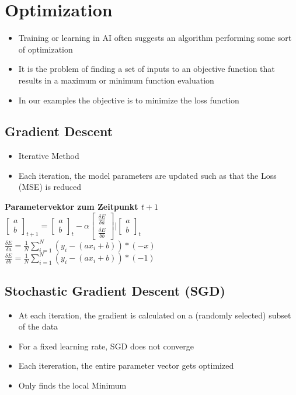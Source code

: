 \section{Optimization}
\begin{itemize}
    \item Training or learning in AI often suggests an algorithm performing some sort of optimization
    \item It is the problem of finding a set of inputs to an objective function that results in a maximum or minimum function evaluation
    \item In our examples the objective is to minimize the loss function
\end{itemize}

\subsection{Gradient Descent}
\begin{itemize}
    \item Iterative Method
    \item Each iteration, the model parameters are updated such as that the Loss (MSE) is reduced
\end{itemize}
\begin{center}
    \textbf{Parametervektor zum Zeitpunkt $t+1$}\\
    $\begin{bmatrix}
        a \\b
    \end{bmatrix}_{t+1} 
    = 
    \begin{bmatrix}
        a\\b
    \end{bmatrix}_{t} - \alpha 
    \begin{bmatrix}
        \frac{\delta E}{\delta a} \\ \frac{\delta E}{\delta b}
    \end{bmatrix}
    | \begin{bmatrix}
        a \\ b
    \end{bmatrix}_{t}$\\
    $\frac{\delta E}{\delta a} = \frac{1}{N} \displaystyle\sum_{i = 1}^{N}(y_i - (ax_i + b))*(-x)$\\
    $\frac{\delta E}{\delta b} = \frac{1}{N} \displaystyle\sum_{i = 1}^{N}(y_i - (ax_i + b))*(-1)$
\end{center}

\subsection{Stochastic Gradient Descent (SGD)}
\begin{itemize}
    \item At each iteration, the gradient is calculated on a (randomly selected) subset of the data
    \item For a fixed learning rate, SGD does not converge
    \item Each itereration, the entire parameter vector gets optimized
    \item Only finds the local Minimum
\end{itemize}

